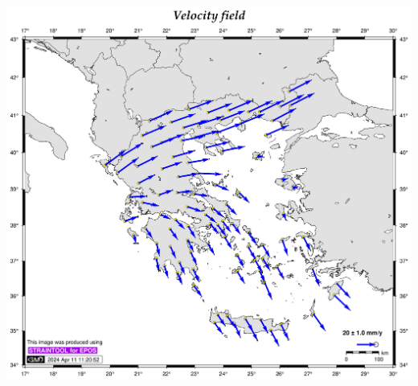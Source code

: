\documentclass[landscape,a0paper,fontscale=0.346]{baposter} %
\begin{document}
\begin{poster}
{\begin{minipage}[c]{0.33\linewidth}
\end{minipage}
\begin{minipage}[c]{0.34\linewidth}
  \begin{center}
  \includegraphics[width=.9\textwidth]{hepos22-output_vel.jpg}
  \end{center}
\end{minipage}

}
\end{poster}
\end{document}
